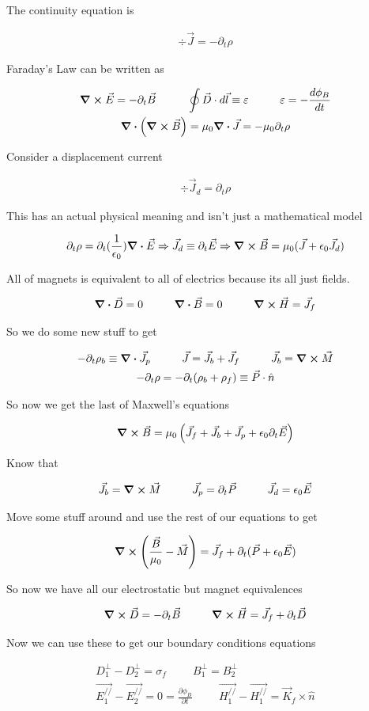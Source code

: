\documentclass[fleqn]{report}
\newcommand{\hp}{\hspace{1cm}}
\newcommand{\del}{\partial}
\newcommand{\equations} [1] {
\begin{gather*}
#1
\end{gather*}
}
\begin{document}
The continuity equation is 
\equations{
    \div \vec J 
    =
    - \del_t \rho
}

Faraday's Law can be written as 
\equations{
    \curl \vec E 
    =
    - \del_t \vec B 
    \hp 
    \oint \vec D \cdot d \vec l \equiv \varepsilon 
    \hp 
    \varepsilon 
    =
    - \frac{d \phi_B}{dt}
    \\
    \div 
    (\curl \vec B)
    =
    \mu_0 \div \vec J
    =
    - \mu_0 \del_t \rho 
}

Consider a displacement current 
\equations{
    \div \vec J_d 
    =
    \del_t \rho 
}

This has an actual physical meaning and isn't just a mathematical model 

\equations{
    \del_t \rho 
    =
    \del_t 
    (\frac{1}{\epsilon_0}) \div \vec E 
    \Rightarrow 
    \vec J_d 
    \equiv 
    \del_t \vec E 
    \Rightarrow 
    \curl \vec B 
    =  
    \mu_0 
    (\vec J + \epsilon_0 \vec J_d)
}

All of magnets is equivalent to all of electrics because its all just fields. 
\equations{
    \div \vec D 
    =
    0
    \hp 
    \div \vec B 
    = 0 
    \hp 
    \curl \vec H 
    = \vec J_f
}

So we do some new stuff to get 
\equations{
    - \del_t \rho_b 
    \equiv 
    \div \vec J_p 
    \hp 
    \vec J 
    =
    \vec J_b 
    +
    \vec J_f 
    \hp 
    \vec J_b 
    =
    \curl \vec M 
    \\
    - \del_t \rho 
    =
    - \del_t 
    (\rho_b + \rho_f)
    \equiv 
    \vec P \cdot \hat n
}

So now we get the last of Maxwell's equations 
\equations{
    \curl \vec B 
    =
    \mu_0 
    \left(
        \vec J_f 
        +
        \vec J_b
        +
        \vec J_p
        +
        \epsilon_0 
        \del_t \vec E 
    \right)
}
Know that 
\equations{
    \vec J_b = \curl \vec M 
    \hp 
    \vec J_p = \del_t \vec P 
    \hp 
    \vec J_d = \epsilon_0 \vec E 
}

Move some stuff around and use the rest of our equations to get 
\equations{
    \curl 
    \left(
        \frac{\vec B}{\mu_0}
        -
        \vec M 
    \right)
    =
    \vec J_f 
    +
    \del_t 
    (\vec P + \epsilon_0 \vec E)
}

So now we have all our electrostatic but magnet equivalences 
\equations{
    \curl \vec D = - \del_t \vec B 
    \hp 
    \curl \vec H 
    =
    \vec J_f + \del_t \vec D 
}

Now we can use these to get our boundary conditions equations 
\equations{
    D_{1}^{\perp}
    -
    D_{2}^{\perp}
    =
    \sigma_f 
    \hp 
    B_{1}^{\perp}
    =
    B_{2}^{\perp}
    \\
    \vec{E_{1}^{//}}
    -
    \vec{E_{2}^{//}}
    = 
    0
    =
    \frac{\del \phi_B}{\del t}
    \hp 
    \vec{H_{1}^{//}}
    -
    \vec{H_{1}^{//}}
    =
    \vec K_f 
    \times \hat n 
}
\end{document}
